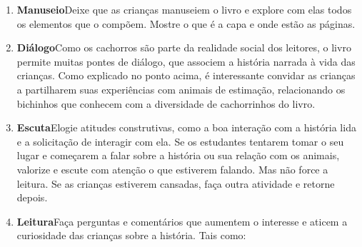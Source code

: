 \documentclass[11pt]{extarticle}
\begin{document}
\begin{enumerate}
\item \textbf{Manuseio}\quad Deixe que as crianças manuseiem o livro 
e explore com elas todos os elementos que o compõem. Mostre o que é a 
capa e onde estão as páginas.



\item \textbf{Diálogo}\quad Como os cachorros são parte da realidade social dos leitores, o livro permite muitas pontes de diálogo, que associem a história narrada à vida das crianças.
Como explicado no ponto acima, é interessante convidar as crianças a partilharem suas experiências com animais de estimação, relacionando os bichinhos que conhecem com a diversidade de cachorrinhos do livro.


\item \textbf{Escuta}\quad Elogie atitudes construtivas, como 
a boa interação com a história lida e a solicitação de interagir com ela. Se os estudantes tentarem 
tomar o seu lugar e começarem a falar sobre a história ou sua relação com os animais, valorize e escute com atenção o que estiverem falando. Mas não 
force a leitura. Se as crianças estiverem cansadas, faça outra atividade 
e retorne depois. 


\item \textbf{Leitura}\quad Faça perguntas e comentários que aumentem o 
interesse e aticem a curiosidade das crianças sobre a história.
Tais como: 


\end{enumerate}
\end{document}
